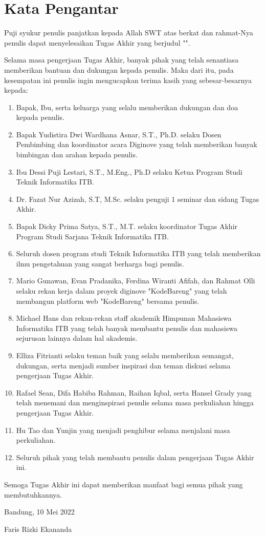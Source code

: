 \chapter*{Kata Pengantar}

Puji syukur penulis panjatkan kepada Allah SWT atas berkat dan rahmat-Nya penulis dapat menyelesaikan Tugas Akhir yang berjudul "\thetitle".

Selama masa pengerjaan Tugas Akhir, banyak pihak yang telah senantiasa memberikan bantuan dan dukungan kepada penulis. Maka dari itu, pada kesempatan ini penulis ingin mengucapkan terima kasih yang sebesar-besarnya kepada:

\begin{enumerate}
  \item Bapak, Ibu, serta keluarga yang selalu memberikan dukungan dan doa kepada penulis.
  \item Bapak Yudistira Dwi Wardhana Asnar, S.T., Ph.D. selaku Dosen Pembimbing dan koordinator acara Diginove yang telah memberikan banyak bimbingan dan arahan kepada penulis.
  \item Ibu Dessi Puji Lestari, S.T., M.Eng., Ph.D selaku Ketua Program Studi Teknik Informatika ITB.
  \item Dr. Fazat Nur Azizah, S.T, M.Sc. selaku penguji 1 seminar dan sidang Tugas Akhir.
  \item Bapak Dicky Prima Satya, S.T., M.T. selaku koordinator Tugas Akhir Program Studi Sarjana Teknik Informatika ITB.
  \item Seluruh dosen program studi Teknik Informatika ITB yang telah memberikan ilmu pengetahuan yang sangat berharga bagi penulis.
  \item Mario Gunawan, Evan Pradanika, Ferdina Wiranti Afifah, dan Rahmat Olli selaku rekan kerja dalam proyek diginove "KodeBareng" yang telah membangun platform web "KodeBareng" bersama penulis.
  \item Michael Hans dan rekan-rekan staff akademik Himpunan Mahasiswa Informatika ITB yang telah banyak membantu penulis dan mahasiswa sejurusan lainnya dalam hal akademis.
  \item Elliza Fitrianti selaku teman baik yang selalu memberikan semangat, dukungan, serta menjadi sumber inspirasi dan teman diskusi selama pengerjaan Tugas Akhir.
  \item Rafael Sean, Difa Habiba Rahman, Raihan Iqbal, serta Hansel Grady yang telah menemani dan menginspirasi penulis selama masa perkuliahan hingga pengerjaan Tugas Akhir.
  \item Hu Tao dan Yunjin yang menjadi penghibur selama menjalani masa perkuliahan.
  \item Seluruh pihak yang telah membantu penulis dalam pengerjaan Tugas Akhir ini.
\end{enumerate}

Semoga Tugas Akhir ini dapat memberikan manfaat bagi semua pihak yang membutuhkannya.

\begin{flushright}
  Bandung, 10 Mei 2022


  Faris Rizki Ekananda
\end{flushright}